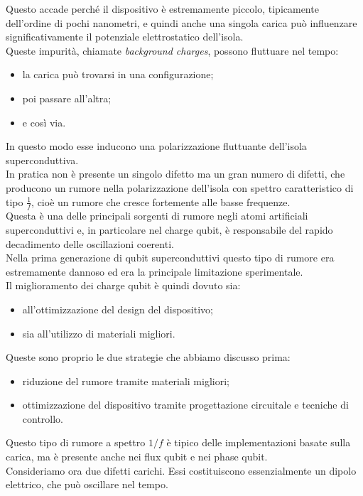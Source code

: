 Questo accade perché il dispositivo è estremamente piccolo, tipicamente dell'ordine di pochi nanometri, e quindi anche una singola carica può influenzare significativamente il potenziale elettrostatico dell'isola.\\
Queste impurità, chiamate \emph{background charges}, possono fluttuare nel tempo:
\begin{itemize}[leftmargin=0.5cm]
    \item la carica può trovarsi in una configurazione;
    \item poi passare all'altra;
    \item e così via.
\end{itemize}
In questo modo esse inducono una polarizzazione fluttuante dell'isola superconduttiva.\\
In pratica non è presente un singolo difetto ma un gran numero di difetti, che producono un rumore nella polarizzazione dell'isola con spettro caratteristico di tipo $\frac{1}{f}$, cioè un rumore che cresce fortemente alle basse frequenze.\\
Questa è una delle principali sorgenti di rumore negli atomi artificiali superconduttivi e, in particolare nel charge qubit, è responsabile del rapido decadimento delle oscillazioni coerenti.\\
Nella prima generazione di qubit superconduttivi questo tipo di rumore era estremamente dannoso ed era la principale limitazione sperimentale.\\
Il miglioramento dei charge qubit è quindi dovuto sia:
\begin{itemize}[leftmargin=0.5cm]
    \item all'ottimizzazione del design del dispositivo;
    \item sia all'utilizzo di materiali migliori.
\end{itemize}
Queste sono proprio le due strategie che abbiamo discusso prima:
\begin{itemize}[leftmargin=0.5cm]
    \item riduzione del rumore tramite materiali migliori;
    \item ottimizzazione del dispositivo tramite progettazione circuitale e tecniche di controllo.
\end{itemize}
Questo tipo di rumore a spettro $1/f$ è tipico delle implementazioni basate sulla carica, ma è presente anche nei flux qubit e nei phase qubit.\\
Consideriamo ora due difetti carichi. Essi costituiscono essenzialmente un dipolo elettrico, che può oscillare nel tempo.\\
